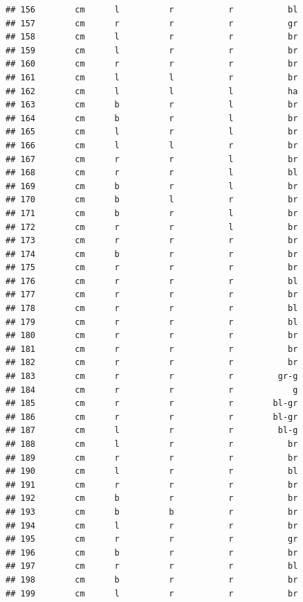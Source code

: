 \documentclass[]{article}
\begin{document}
\begin{verbatim}
## 156        cm      l          r           r           bl
## 157        cm      r          r           r           gr
## 158        cm      l          r           r           br
## 159        cm      l          r           r           br
## 160        cm      r          r           r           br
## 161        cm      l          l           r           br
## 162        cm      l          l           l           ha
## 163        cm      b          r           l           br
## 164        cm      b          r           l           br
## 165        cm      l          r           l           br
## 166        cm      l          l           r           br
## 167        cm      r          r           l           br
## 168        cm      r          r           l           bl
## 169        cm      b          r           l           br
## 170        cm      b          l           r           br
## 171        cm      b          r           l           br
## 172        cm      r          r           l           br
## 173        cm      r          r           r           br
## 174        cm      b          r           r           br
## 175        cm      r          r           r           br
## 176        cm      r          r           r           bl
## 177        cm      r          r           r           br
## 178        cm      r          r           r           bl
## 179        cm      r          r           r           bl
## 180        cm      r          r           r           br
## 181        cm      r          r           r           br
## 182        cm      r          r           r           br
## 183        cm      r          r           r         gr-g
## 184        cm      r          r           r            g
## 185        cm      r          r           r        bl-gr
## 186        cm      r          r           r        bl-gr
## 187        cm      l          r           r         bl-g
## 188        cm      l          r           r           br
## 189        cm      r          r           r           br
## 190        cm      l          r           r           bl
## 191        cm      r          r           r           br
## 192        cm      b          r           r           br
## 193        cm      b          b           r           br
## 194        cm      l          r           r           br
## 195        cm      r          r           r           gr
## 196        cm      b          r           r           br
## 197        cm      r          r           r           bl
## 198        cm      b          r           r           br
## 199        cm      l          r           r           br

\end{verbatim}
\end{document}
